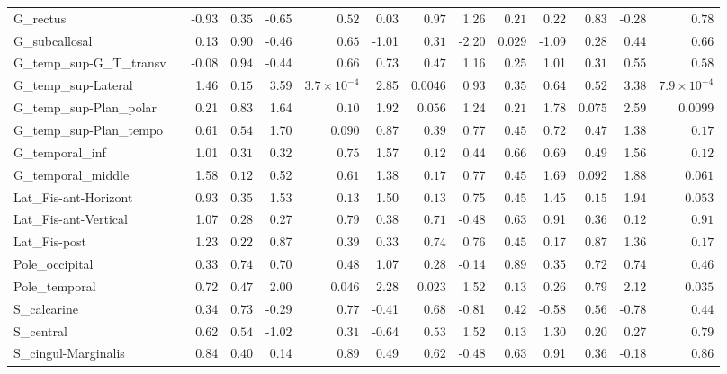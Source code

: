 {\begin{longtable}{llrrrrrrrrrrrr}
G\_rectus &  & -0.93 & $0.35$ & -0.65 & $0.52$ & 0.03 & $0.97$ & 1.26 & $0.21$ & 0.22 & $0.83$ & -0.28 & $0.78$ \\
G\_subcallosal &  & 0.13 & $0.90$ & -0.46 & $0.65$ & -1.01 & $0.31$ & -2.20 & $0.029$ & -1.09 & $0.28$ & 0.44 & $0.66$ \\
G\_temp\_sup-G\_T\_transv &  & -0.08 & $0.94$ & -0.44 & $0.66$ & 0.73 & $0.47$ & 1.16 & $0.25$ & 1.01 & $0.31$ & 0.55 & $0.58$ \\
G\_temp\_sup-Lateral &  & 1.46 & $0.15$ & 3.59 & $3.7{\times}10^{-4}$ & 2.85 & $0.0046$ & 0.93 & $0.35$ & 0.64 & $0.52$ & 3.38 & $7.9{\times}10^{-4}$ \\
G\_temp\_sup-Plan\_polar &  & 0.21 & $0.83$ & 1.64 & $0.10$ & 1.92 & $0.056$ & 1.24 & $0.21$ & 1.78 & $0.075$ & 2.59 & $0.0099$ \\
G\_temp\_sup-Plan\_tempo &  & 0.61 & $0.54$ & 1.70 & $0.090$ & 0.87 & $0.39$ & 0.77 & $0.45$ & 0.72 & $0.47$ & 1.38 & $0.17$ \\
G\_temporal\_inf &  & 1.01 & $0.31$ & 0.32 & $0.75$ & 1.57 & $0.12$ & 0.44 & $0.66$ & 0.69 & $0.49$ & 1.56 & $0.12$ \\
G\_temporal\_middle &  & 1.58 & $0.12$ & 0.52 & $0.61$ & 1.38 & $0.17$ & 0.77 & $0.45$ & 1.69 & $0.092$ & 1.88 & $0.061$ \\
Lat\_Fis-ant-Horizont &  & 0.93 & $0.35$ & 1.53 & $0.13$ & 1.50 & $0.13$ & 0.75 & $0.45$ & 1.45 & $0.15$ & 1.94 & $0.053$ \\
Lat\_Fis-ant-Vertical &  & 1.07 & $0.28$ & 0.27 & $0.79$ & 0.38 & $0.71$ & -0.48 & $0.63$ & 0.91 & $0.36$ & 0.12 & $0.91$ \\
Lat\_Fis-post &  & 1.23 & $0.22$ & 0.87 & $0.39$ & 0.33 & $0.74$ & 0.76 & $0.45$ & 0.17 & $0.87$ & 1.36 & $0.17$ \\
Pole\_occipital &  & 0.33 & $0.74$ & 0.70 & $0.48$ & 1.07 & $0.28$ & -0.14 & $0.89$ & 0.35 & $0.72$ & 0.74 & $0.46$ \\
Pole\_temporal &  & 0.72 & $0.47$ & 2.00 & $0.046$ & 2.28 & $0.023$ & 1.52 & $0.13$ & 0.26 & $0.79$ & 2.12 & $0.035$ \\
S\_calcarine &  & 0.34 & $0.73$ & -0.29 & $0.77$ & -0.41 & $0.68$ & -0.81 & $0.42$ & -0.58 & $0.56$ & -0.78 & $0.44$ \\
S\_central &  & 0.62 & $0.54$ & -1.02 & $0.31$ & -0.64 & $0.53$ & 1.52 & $0.13$ & 1.30 & $0.20$ & 0.27 & $0.79$ \\
S\_cingul-Marginalis &  & 0.84 & $0.40$ & 0.14 & $0.89$ & 0.49 & $0.62$ & -0.48 & $0.63$ & 0.91 & $0.36$ & -0.18 & $0.86$ \\

\end{longtable}}
